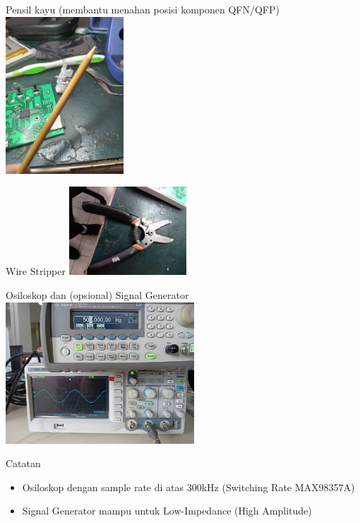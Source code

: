 \documentclass[table,dvipsnames]{beamer}
\begin{document}
	\begin{frame}
		\begin{exampleblock}{Pensil kayu (membantu menahan posisi komponen QFN/QFP)}
			\centering
			\includegraphics[width=125pt]{images/pensil_kayu}
		\end{exampleblock}

		\begin{exampleblock}{Wire Stripper}
			\centering
			\includegraphics[width=125pt]{images/tang_kabel}
		\end{exampleblock}
	\end{frame}

	\begin{frame}
		\begin{exampleblock}{Osiloskop dan (opsional) Signal Generator}
			\centering
			\includegraphics[width=200pt]{images/osi_siggen}
		\end{exampleblock}
	
		\begin{exampleblock}{Catatan}
			\begin{itemize}
				\item Osiloskop dengan sample rate di atas 300kHz (Switching Rate MAX98357A)
				\item Signal Generator mampu untuk Low-Impedance (High Amplitude)
			\end{itemize}
		\end{exampleblock}
	\end{frame}
	
\end{document}
